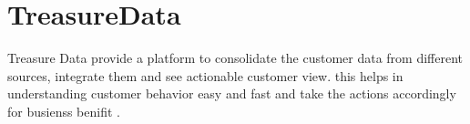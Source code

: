 \section{TreasureData}

Treasure Data provide a platform to consolidate the customer data from different sources, integrate them and see actionable customer view. this helps in understanding customer behavior easy and fast and take the actions accordingly for busienss benifit \cites{hid-sp18-511-treasuredata}.
